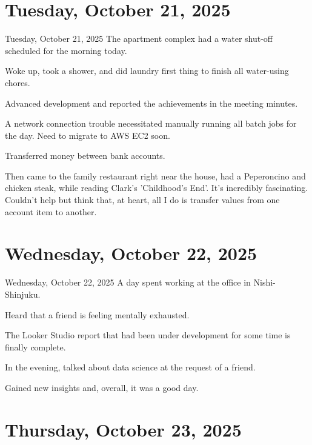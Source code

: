 \documentclass[dvipdfmx, autodetect-engine, aspectratio=169, 10.5pt]{beamer}
\begin{document}
\section{Tuesday, October 21, 2025}

\begin{frame}{Tuesday, October 21, 2025}
	The apartment complex had a water shut-off scheduled for the morning today.

	Woke up, took a shower, and did laundry first thing to finish all water-using chores.

	Advanced development and reported the achievements in the meeting minutes.

	A network connection trouble necessitated manually running all batch jobs for the day.
	Need to migrate to AWS EC2 soon.

	Transferred money between bank accounts.

	Then came to the family restaurant right near the house, had a Peperoncino and chicken steak, while reading Clark's 'Childhood's End'.
	It's incredibly fascinating.
	Couldn't help but think that, at heart, all I do is transfer values from one account item to another.
\end{frame}

\section{Wednesday, October 22, 2025}

\begin{frame}{Wednesday, October 22, 2025}
	A day spent working at the office in Nishi-Shinjuku.

	Heard that a friend is feeling mentally exhausted.

	The Looker Studio report that had been under development for some time is finally complete.

	In the evening, talked about data science at the request of a friend.

	Gained new insights and, overall, it was a good day.
\end{frame}

\section{Thursday, October 23, 2025}
\end{document}
